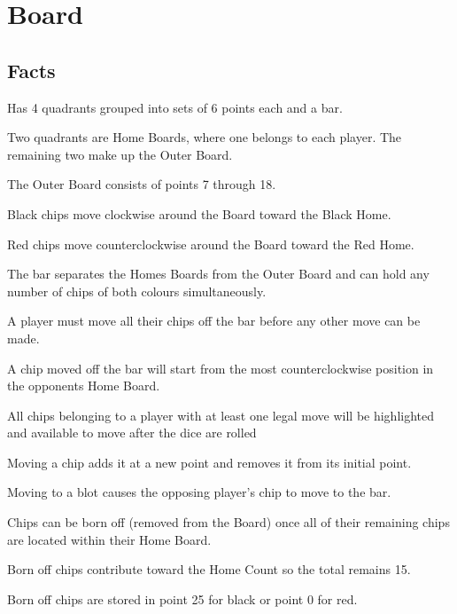 \section{Board}

\subsection{Facts}

\begin{dashed}
    \item Has 4 quadrants grouped into sets of 6 points each and a bar.
    \item Two quadrants are Home Boards, where one belongs to each player. The remaining two make up the Outer Board.
    \item The Outer Board consists of points 7 through 18.
    \item Black chips move clockwise around the Board toward the Black Home.
    \item Red chips move counterclockwise around the Board toward the Red Home.
    \item The bar separates the Homes Boards from the Outer Board and can hold any number of chips of both colours simultaneously.
    \item A player must move all their chips off the bar before any other move can be made.
    \item A chip moved off the bar will start from the most counterclockwise position in the opponents Home Board.
    \item All chips belonging to a player with at least one legal move will be highlighted and available to move after the dice are rolled
    \item Moving a chip adds it at a new point and removes it from its initial point.
    \item Moving to a blot causes the opposing player’s chip to move to the bar.
    \item Chips can be born off (removed from the Board) once all of their remaining chips are located within their Home Board.
    \item Born off chips contribute toward the Home Count so the total remains 15.
    \item Born off chips are stored in point 25 for black or point 0 for red.
\end{dashed}


